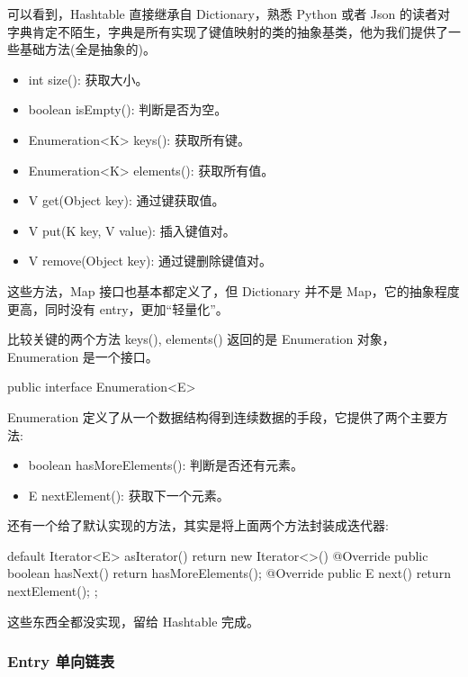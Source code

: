 可以看到，Hashtable 直接继承自 Dictionary，熟悉 Python 或者 Json 的读者对字典肯定不陌生，字典是所有实现了键值映射的类的抽象基类，他为我们提供了一些基础方法(全是抽象的)。

\begin{itemize}
    \item int size(): 获取大小。
    \item boolean isEmpty(): 判断是否为空。
    \item Enumeration<K> keys(): 获取所有键。
    \item Enumeration<K> elements(): 获取所有值。
    \item V get(Object key): 通过键获取值。
    \item V put(K key, V value): 插入键值对。
    \item V remove(Object key): 通过键删除键值对。
\end{itemize}

这些方法，Map 接口也基本都定义了，但 Dictionary 并不是 Map，它的抽象程度更高，同时没有 entry，更加``轻量化''。

比较关键的两个方法 keys(), elements() 返回的是 Enumeration 对象，Enumeration 是一个接口。

\begin{Java}
public interface Enumeration<E>
\end{Java}

Enumeration 定义了从一个数据结构得到连续数据的手段，它提供了两个主要方法:

\begin{itemize}
    \item boolean hasMoreElements(): 判断是否还有元素。
    \item E nextElement(): 获取下一个元素。
\end{itemize}

还有一个给了默认实现的方法，其实是将上面两个方法封装成迭代器:

\begin{Java}
default Iterator<E> asIterator() {
    return new Iterator<>() {
        @Override public boolean hasNext() {
            return hasMoreElements();
        }
        @Override public E next() {
            return nextElement();
        }
    };
}
\end{Java}

这些东西全都没实现，留给 Hashtable 完成。

\subsubsection{Entry 单向链表}

